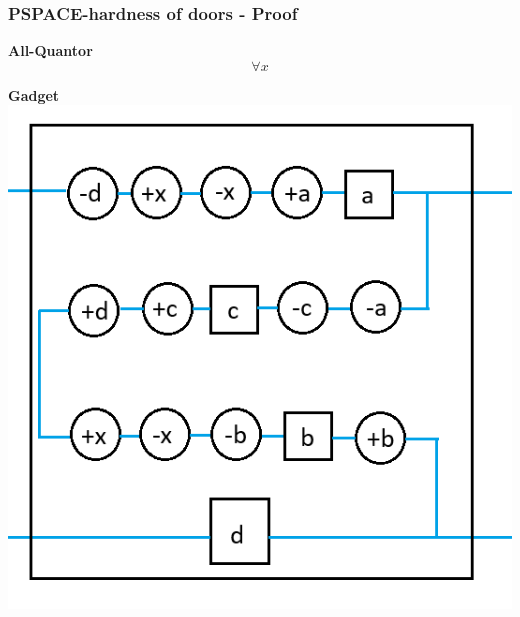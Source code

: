 \documentclass{beamer}
\begin{document}
\begin{frame}
  \frametitle{PSPACE-hardness of doors - Proof}
  \begin{minipage}[t]{0.45\textwidth}
    \textbf{All-Quantor}
    \[ \forall x \]
  \end{minipage}
  \begin{minipage}[t]{0.45\textwidth}
    \textbf{Gadget}
    \includegraphics[width=1.3\textwidth]{res/prove/AllGadget.png}
  \end{minipage}
\end{frame}
\end{document}
